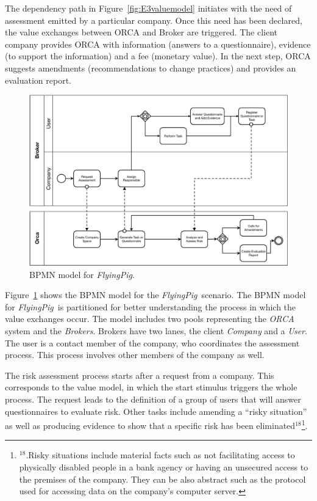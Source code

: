 \documentclass[12pt,twoside]{article}
\theoremstyle{plain}
\theoremstyle{plain}
\def\FlyingPig{\textsl{FlyingPig}\xspace}
\begin{document}
\begin{multicols}{2}
The dependency path in Figure~\ref{fig:E3valuemodel} initiates with the need of assessment emitted by a particular company.
Once this need has been declared, the value exchanges between ORCA and Broker are triggered.
The client company provides ORCA with information (answers to a questionnaire), evidence (to support the information) and a fee (monetary value).
In the next step, ORCA suggests amendments (recommendations to change practices) and provides an evaluation report.

\begin{figure}
\centering
\includegraphics[width=1.0\textwidth]{BPMN_GCP.pdf}
\caption{BPMN model for \FlyingPig.\label{fig:BPMNmodel}}
\end{figure}


Figure~\ref{fig:BPMNmodel} shows the BPMN model
for the \FlyingPig\ scenario. The BPMN model for \FlyingPig\ is partitioned for better understanding the process in which the value exchanges occur.
The model includes two pools representing the \textsl{ORCA} system and the \textsl{Brokers}.
Brokers have two lanes, the client \textsl{Company} and a \textsl{User}.
The user is a contact member of the company, who  coordinates the assessment process.
This process  involves other members of the company as well.

The risk assessment process starts after a request from a company.
This corresponds to the value model, in which the start stimulus triggers the whole process.
The request leads to the definition of a group of users that will answer questionnaires to evaluate risk.
Other tasks include amending a ``risky situation'' as well as producing evidence to show that a specific risk has been eliminated$^{18}$\footnote{$^{18}$.Risky situations include  material facts such as not facilitating access to physically disabled people in a bank agency or having an unsecured access to the premises of the company.
They can be also abstract  such as the protocol used for accessing data on the company's computer server.}.


\end{multicols}
\end{document}

